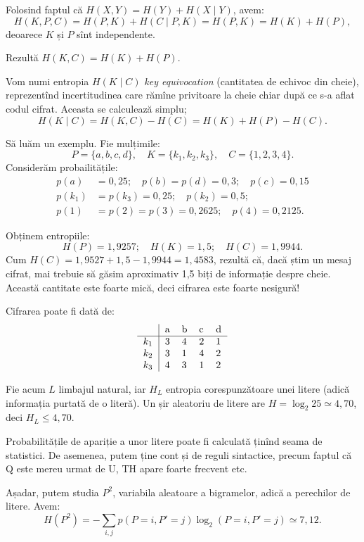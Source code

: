 Folosind faptul că $ H(X, Y) = H(Y) + H(X \mid Y) $, avem:
\[
  H(K, P, C) = H(P, K) + H(C \mid P, K) = H(P, K) = H(K) + H(P),
\]
deoarece $ K $ și $ P $ sînt independente.

Rezultă $ H(K, C) = H(K) + H(P) $.

Vom numi entropia $ H(K \mid C) $ \emph{key equivocation} (cantitatea de
echivoc din cheie), reprezentînd incertitudinea care rămîne privitoare
la cheie chiar după ce s-a aflat codul cifrat. Aceasta se calculează
simplu;
\[
  H(K \mid C) = H(K, C) - H(C) = H(K) + H(P) - H(C).
\]

Să luăm un exemplu. Fie mulțimile:
\[
  P = \{ a, b, c, d \}, \quad K = \{ k_1, k_2, k_3 \}, \quad C = \{ 1, 2, 3, 4 \}.
\]
Considerăm probailitățile:
\begin{align*}
  p(a) &= 0,25; \quad p(b) = p(d) = 0,3; \quad p(c) = 0,15 \\
  p(k_1) &= p(k_3) = 0,25; \quad p(k_2) = 0,5; \\
  p(1) &= p(2) = p(3) = 0,2625; \quad p(4) = 0,2125.
\end{align*}

Obținem entropiile:
\[
  H(P) = 1,9257; \quad H(K) = 1,5; \quad H(C) = 1,9944.
\]
Cum $ H(C) = 1,9527 + 1,5 - 1,9944 = 1,4583 $, rezultă că, dacă știm
un mesaj cifrat, mai trebuie să găsim aproximativ 1,5 biți de informație
despre cheie. Această cantitate este foarte mică, deci cifrarea este
foarte nesigură!

Cifrarea poate fi dată de:
\[
  \begin{tabular}{l|llll}
    & a & b & c & d \\
    \hline
    $ k_1 $ & 3 & 4 & 2 & 1 \\
    $ k_2 $ & 3 & 1 & 4 & 2 \\
    $ k_3 $ & 4 & 3 & 1 & 2
  \end{tabular}
\]

Fie acum $ L $ limbajul natural, iar $ H_L $ entropia corespunzătoare unei
litere (adică informația purtată de o literă). Un șir aleatoriu de
litere are $ H = \log_2 25 \simeq 4,70 $, deci $ H_L \leq 4,70 $.

Probabilitățile de apariție a unor litere poate fi calculată ținînd seama
de statistici. De asemenea, putem ține cont și de reguli sintactice, precum
faptul că Q este mereu urmat de U, TH apare foarte frecvent etc.

Așadar, putem studia $ P^2 $, variabila aleatoare a bigramelor, adică
a perechilor de litere. Avem:
\[
  H(P^2) = -\sum_{i, j} p(P = i, P' = j) \log_2(P = i, P' = j) \simeq 7,12.
\]

